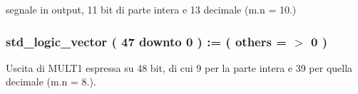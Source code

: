 segnale in output, 11 bit di parte intera e 13 decimale (m.\+n = 10.) 

\subsubsection[{\texorpdfstring{mult1\+\_\+out}{mult1_out}}]{ {\bfseries \textcolor{vhdlchar}{std\+\_\+logic\+\_\+vector}\textcolor{vhdlchar}{ }\textcolor{vhdlchar}{(}\textcolor{vhdlchar}{ }\textcolor{vhdlchar}{ } \textcolor{vhdldigit}{47} \textcolor{vhdlchar}{ }\textcolor{vhdlchar}{downto}\textcolor{vhdlchar}{ }\textcolor{vhdlchar}{ } \textcolor{vhdldigit}{0} \textcolor{vhdlchar}{ }\textcolor{vhdlchar}{)}\textcolor{vhdlchar}{ }\textcolor{vhdlchar}{ }\textcolor{vhdlchar}{ }\textcolor{vhdlchar}{\+:}\textcolor{vhdlchar}{=}\textcolor{vhdlchar}{ }\textcolor{vhdlchar}{(}\textcolor{vhdlchar}{ }\textcolor{vhdlchar}{ }\textcolor{vhdlchar}{others}\textcolor{vhdlchar}{ }\textcolor{vhdlchar}{ }\textcolor{vhdlchar}{=}\textcolor{vhdlchar}{ }\textcolor{vhdlchar}{$>$}\textcolor{vhdlchar}{ }\textcolor{vhdlchar}{\textquotesingle{}}\textcolor{vhdlchar}{ } \textcolor{vhdldigit}{0} \textcolor{vhdlchar}{ }\textcolor{vhdlchar}{\textquotesingle{}}\textcolor{vhdlchar}{ }\textcolor{vhdlchar}{)}\textcolor{vhdlchar}{ }} \hspace{0.3cm}{\ttfamily [Signal]}}\hypertarget{group___linear_regression_ga47ffff025ca221db798ee154ae332d1e}{}\label{group___linear_regression_ga47ffff025ca221db798ee154ae332d1e}


Uscita di M\+U\+L\+T1 espressa su 48 bit, di cui 9 per la parte intera e 39 per quella decimale (m.\+n = 8.). 

